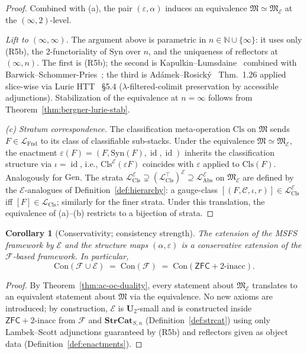 \documentclass[11pt]{article}
\theoremstyle{plain}
\newtheorem{corollary}[theorem]{Corollary}
\theoremstyle{definition}
\newcommand{\cF}{\mathcal{F}}
\newcommand{\cC}{\mathcal{C}}
\newcommand{\fM}{\mathfrak{M}}
\newcommand{\LFnd}{\mathcal{L}_{\mathrm{Fnd}}}
\newcommand{\LCls}{\mathcal{L}_{\mathrm{Cls}}}
\newcommand{\LClsMax}{\mathcal{L}_{\mathrm{Cls}}^{\top}}
\newcommand{\LAbs}{\mathcal{L}_{\mathrm{Abs}}}
\newcommand{\Syn}{\mathrm{Syn}}
\newcommand{\Con}{\mathrm{Con}}
\newcommand{\ZFC}{\mathsf{ZFC}}
\newcommand{\cE}{\mathcal{E}}
\newcommand{\LAbsE}{\LAbs^{\cE}}
\newcommand{\LClsE}{\LCls^{\cE}}
\newcommand{\LClsMaxE}{(\LClsMax)^{\cE}}
\DeclareMathOperator{\id}{id}
\begin{document}
\begin{proof}
Combined with (a), the pair $(\varepsilon, \alpha)$ induces an equivalence $\fM \simeq \fM_\cE$ at the $(\infty, 2)$-level.

\emph{Lift to $(\infty, \infty)$.} The argument above is parametric in $n \in \mathbb{N} \cup \{\infty\}$: it uses only (R5b), the $2$-functoriality of $\Syn$ over $n$, and the uniqueness of reflectors at $(\infty, n)$. The first is (R5b); the second is Kapulkin--Lumsdaine~\cite{KapulkinLumsdaine2021} combined with Barwick--Schommer-Pries~\cite{BarwickSchommerPries2021}; the third is Ad\'amek--Rosick\'y~\cite{AdamekRosicky1994} Thm.~1.26 applied slice-wise via Lurie HTT~\cite{LurieHTT} \S 5.4 ($\lambda$-filtered-colimit preservation by accessible adjunctions). Stabilization of the equivalence at $n = \infty$ follows from Theorem~\ref{thm:bergner-lurie-stab}.

\emph{(c) Stratum correspondence.} The classification meta-operation $\mathrm{Cls}$ on $\fM$ sends $F \in \LFnd$ to its class of classifiable sub-stacks. Under the equivalence $\fM \simeq \fM_\cE$, the enactment $\varepsilon(F) = (F, \Syn(F), \id, \id)$ inherits the classification structure via $\iota = \id$, i.e., $\mathrm{Cls}^\cE(\varepsilon F)$ coincides with $\varepsilon$ applied to $\mathrm{Cls}(F)$. Analogously for $\mathrm{Gen}$. The strata $\LClsE \supsetneq \LClsMaxE \supseteq \LAbsE$ on $\fM_\cE$ are defined by the $\cE$-analogues of Definition~\ref{def:hierarchy}: a gauge-class $[(F, \cC, \iota, r)] \in \LClsE$ iff $[F] \in \LCls$; similarly for the finer strata. Under this translation, the equivalence of (a)--(b) restricts to a bijection of strata.
\end{proof}

\begin{corollary}[Conservativity; consistency strength]\label{cor:ac-oc-conservativity}
The extension of the MSFS framework by $\cE$ and the structure maps $(\alpha, \varepsilon)$ is a conservative extension of the $\cF$-based framework. In particular,
\[
  \Con(\cF \cup \cE) \;=\; \Con(\cF) \;=\; \Con(\ZFC + 2\text{-inacc}).
\]
\end{corollary}

\begin{proof}
By Theorem~\ref{thm:ac-oc-duality}, every statement about $\fM_\cE$ translates to an equivalent statement about $\fM$ via the equivalence. No new axioms are introduced; by construction, $\cE$ is $\mathbf{U}_2$-small and is constructed inside $\ZFC + 2\text{-inacc}$ from $\cF$ and $\mathbf{StrCat}_{S, n}$ (Definition~\ref{def:strcat}) using only Lambek--Scott adjunctions guaranteed by (R5b) and reflectors given as object data (Definition~\ref{def:enactments}).
\end{proof}
\end{document}
